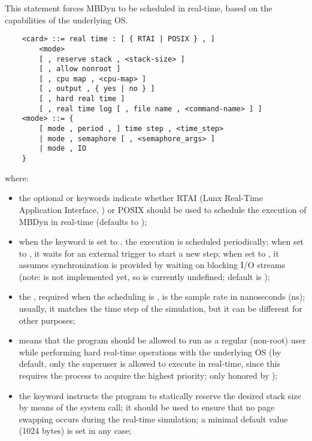 \noindent
This statement forces MBDyn to be scheduled in real-time,
based on the capabilities of the underlying OS.
\begin{verbatim}
    <card> ::= real time : [ { RTAI | POSIX } , ]
        <mode>
        [ , reserve stack , <stack-size> ]
        [ , allow nonroot ]
        [ , cpu map , <cpu-map> ]
        [ , output , { yes | no } ]
        [ , hard real time ]
        [ , real time log [ , file name , <command-name> ] ]
    <mode> ::= {
        [ mode , period , ] time step , <time_step>
        | mode , semaphore [ , <semaphore_args> ]
        | mode , IO
    }
\end{verbatim}
where:
\begin{itemize}
\item the optional  or  keywords indicate whether
RTAI (Lunx Real-Time Application Interface, )
or POSIX should be used to schedule the execution of MBDyn in real-time
(defaults to );

\item when the keyword  is set to , the execution
is scheduled periodically; when set to , it waits 
for an external trigger to start a new step;
when set to , it assumes synchronization is provided
by waiting on blocking I/O streams
(note:  is not implemented yet,
so  
is currently undefined; default is );

\item the , required when the scheduling is ,
is the sample rate in nanoseconds (ns); 
usually, it matches the time step of the simulation,
but it can be different for other purposes;

\item {} means that the program should be allowed to run
as a regular (non-root) user while performing hard real-time operations
with the underlying OS (by default, only the superuser is allowed
to execute in real-time, since this requires the process to acquire
the highest priority; only honored by );

\item the keyword  instructs the program 
to statically reserve the desired stack size by means 
of the  system call; it should be used to ensure 
that no page swapping occurs during the real-time simulation;
a minimal default value (1024 bytes) is set in any case;


\end{itemize}

